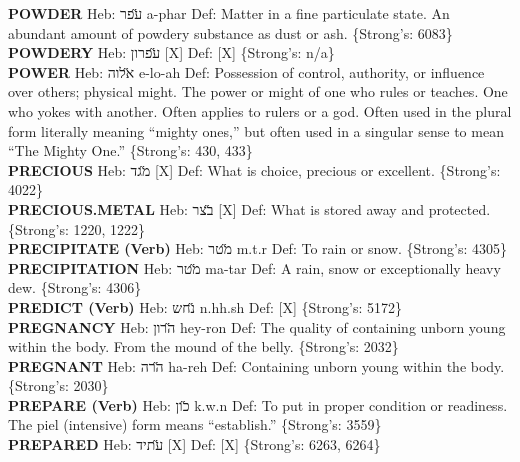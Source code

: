 {\textbf{POWDER} Heb: {\large\H עפר} a-phar Def: Matter in a fine particulate state. An abundant amount of powdery substance as dust or ash. \{Strong's: 6083\}\hfill{}\\

\textbf{POWDERY} Heb: {\large\H עפרון} {[}X{]} Def: {[}X{]} \{Strong's: n/a\}\hfill{}\\

\textbf{POWER} Heb: {\large\H אלוה} e-lo-ah Def: Possession of control, authority, or influence over others; physical might. The power or might of one who rules or teaches. One who yokes with another. Often applies to rulers or a god. Often used in the plural form literally meaning ``mighty ones,'' but often used in a singular sense to mean ``The Mighty One.'' \{Strong's: 430, 433\}\hfill{}\\

\textbf{PRECIOUS} Heb: {\large\H מגד} {[}X{]} Def: What is choice, precious or excellent. \{Strong's: 4022\}\hfill{}\\

\textbf{PRECIOUS.METAL} Heb: {\large\H בצר} {[}X{]} Def: What is stored away and protected. \{Strong's: 1220, 1222\}\hfill{}\\

\textbf{PRECIPITATE (Verb)} Heb: {\large\H מטר} m.t.r Def: To rain or snow. \{Strong's: 4305\}\hfill{}\\

\textbf{PRECIPITATION} Heb: {\large\H מטר} ma-tar Def: A rain, snow or exceptionally heavy dew. \{Strong's: 4306\}\hfill{}\\

\textbf{PREDICT (Verb)} Heb: {\large\H נחש} n.hh.sh Def: {[}X{]} \{Strong's: 5172\}\hfill{}\\

\textbf{PREGNANCY} Heb: {\large\H הרון} hey-ron Def: The quality of containing unborn young within the body. From the mound of the belly. \{Strong's: 2032\}\hfill{}\\

\textbf{PREGNANT} Heb: {\large\H הרה} ha-reh Def: Containing unborn young within the body. \{Strong's: 2030\}\hfill{}\\

\textbf{PREPARE (Verb)} Heb: {\large\H כון} k.w.n Def: To put in proper condition or readiness. The piel (intensive) form means ``establish.'' \{Strong's: 3559\}\hfill{}\\

\textbf{PREPARED} Heb: {\large\H עתיד} {[}X{]} Def: {[}X{]} \{Strong's: 6263, 6264\}\hfill{}\\

}
